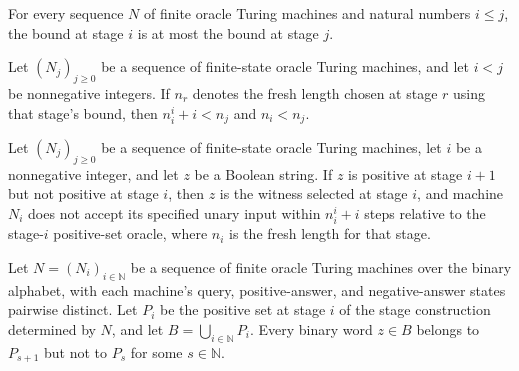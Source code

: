 \begin{theorem}
\label{Complexity.stage_bound_mono}
\leanok
{}
For every sequence $N$ of finite oracle Turing machines and natural numbers $i\le j$,
the bound at stage $i$ is at most the bound at stage $j$.
\end{theorem}

\begin{theorem}
\label{Complexity.stage_later}
\leanok
{}
Let $(N_j)_{j\ge0}$ be a sequence of finite-state oracle Turing machines, and let $i<j$
be nonnegative integers. If $n_r$ denotes the fresh length chosen at stage $r$ using
that stage's bound, then $n_i^i+i<n_j$ and $n_i<n_j$.
\end{theorem}

\begin{theorem}
\label{Complexity.stage_new}
\leanok
{}
Let $(N_j)_{j\ge0}$ be a sequence of finite-state oracle Turing machines, let $i$ be a
nonnegative integer, and let $z$ be a Boolean string. If $z$ is positive at stage $i+1$
but not positive at stage $i$, then $z$ is the witness selected at stage $i$, and
machine $N_i$ does not accept its specified unary input within $n_i^i+i$ steps relative
to the stage-$i$ positive-set oracle, where $n_i$ is the fresh length for that stage.
\end{theorem}

\begin{theorem}
\label{Complexity.exists_entry}
\leanok
{}
Let $N=(N_i)_{i\in\mathbb N}$ be a sequence of finite oracle Turing machines over the
binary alphabet, with each machine’s query, positive-answer, and negative-answer states
pairwise distinct. Let $P_i$ be the positive set at stage $i$ of the stage construction
determined by $N$, and let $B=\bigcup_{i\in\mathbb N}P_i$. Every binary word $z\in B$
belongs to $P_{s+1}$ but not to $P_s$ for some $s\in\mathbb N$.
\end{theorem}

